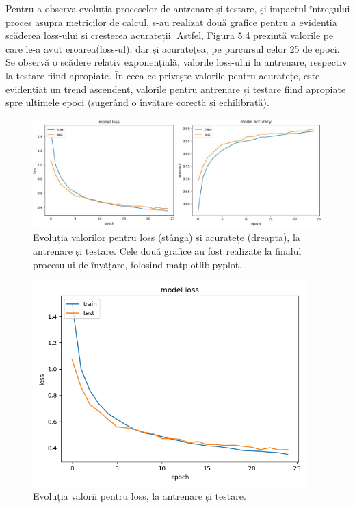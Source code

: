 \documentclass[a4paper,12pt]{report}
\begin{document}
Pentru a observa evoluția proceselor de antrenare și testare, și impactul 
întregului proces asupra metricilor de calcul, s-au realizat două grafice 
pentru a evidenția scăderea loss-ului și creșterea acurateții.
Astfel, Figura 5.4 prezintă valorile pe care le-a avut eroarea(loss-ul), dar 
și acuratețea, 
pe parcursul celor 25 de epoci. Se observă o scădere relativ exponențială,
valorile loss-ului la antrenare, respectiv la testare fiind apropiate.
În ceea ce privește valorile pentru acuratețe, este evidențiat un trend 
ascendent, valorile pentru antrenare și testare 
fiind apropiate spre ultimele epoci (sugerând o învățare 
corectă și echilibrată).

\begin{figure}[h!]
    \centering
    \includegraphics[width=15.8cm]{..//resources//images//loss_accuracy.JPG} 
    \caption{Evoluția valorilor pentru loss (stânga) și acuratețe (dreapta), 
    la antrenare și testare. Cele două grafice au fost realizate la finalul procesului 
    de învățare, folosind matplotlib.pyplot.}
\end{figure}

\iffalse
\begin{figure}[h!]
    \centering
    \includegraphics[width=10.6cm]{..//resources//images//model_loss.png} 
    \caption{Evoluția valorii pentru loss, la antrenare și testare.}
\end{figure}
\end{document}
